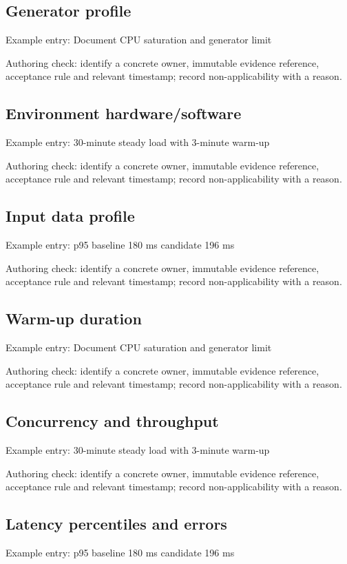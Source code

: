 \documentclass[10pt,letterpaper]{article}
\begin{document}
\subsection{Generator profile}
Example entry: Document CPU saturation and generator limit

Authoring check: identify a concrete owner, immutable evidence reference, acceptance rule and relevant timestamp; record non-applicability with a reason.


\subsection{Environment hardware/software}
Example entry: 30-minute steady load with 3-minute warm-up

Authoring check: identify a concrete owner, immutable evidence reference, acceptance rule and relevant timestamp; record non-applicability with a reason.


\subsection{Input data profile}
Example entry: p95 baseline 180 ms candidate 196 ms

Authoring check: identify a concrete owner, immutable evidence reference, acceptance rule and relevant timestamp; record non-applicability with a reason.


\subsection{Warm-up duration}
Example entry: Document CPU saturation and generator limit

Authoring check: identify a concrete owner, immutable evidence reference, acceptance rule and relevant timestamp; record non-applicability with a reason.


\subsection{Concurrency and throughput}
Example entry: 30-minute steady load with 3-minute warm-up

Authoring check: identify a concrete owner, immutable evidence reference, acceptance rule and relevant timestamp; record non-applicability with a reason.


\subsection{Latency percentiles and errors}
Example entry: p95 baseline 180 ms candidate 196 ms
\end{document}
